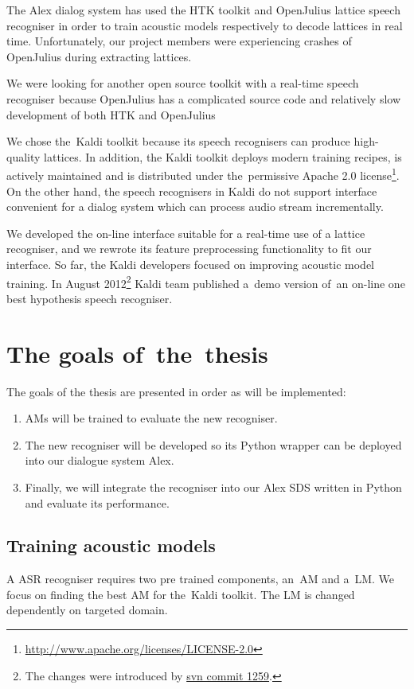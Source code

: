 The Alex dialog system has used the \ac{HTK} toolkit\cite{young94htk} and OpenJulius\cite{lee2009julius} lattice speech recogniser in order to train acoustic models respectively to decode lattices in real time. 
Unfortunately, our project members were experiencing crashes of OpenJulius during extracting lattices.

We were looking for another open source toolkit with a real-time speech recogniser because OpenJulius has a complicated source code and relatively slow development of both \ac{HTK} and OpenJulius

We chose the~Kaldi toolkit because its speech recognisers can produce high-quality lattices.\cite{povey2012generating}
In addition, the Kaldi toolkit deploys modern training recipes, is actively maintained and is distributed under the~permissive Apache 2.0 license\footnote{\url{http://www.apache.org/licenses/LICENSE-2.0}}.
On the other hand, the speech recognisers in Kaldi do not support interface convenient for a dialog system which can process audio stream incrementally.

We developed the on-line interface suitable for a real-time use of a lattice recogniser, and we rewrote its feature preprocessing functionality to fit our interface.
So far, the Kaldi developers focused on improving acoustic model training. 
In August 2012\footnote{The changes were introduced by \href{https://sourceforge.net/p/kaldi/code/1259/}{svn commit 1259}.} Kaldi team published a~demo version of~an on-line one best hypothesis speech recogniser.

\section{The goals of~the~thesis} 
\label{sec:goals}
The goals of the thesis are presented in order as will be implemented:
\begin{enumerate}
    \item \acp{AM} will be trained to evaluate the new recogniser.
    \item The new recogniser will be developed so its Python wrapper can be deployed into our dialogue system Alex.
    \item Finally, we will integrate the recogniser into our Alex \ac{SDS} written in Python and evaluate its performance.
\end{enumerate}

\subsection{Training acoustic models} 
\label{sub:training_kaldi_acoustic_models}
A \acl{ASR} recogniser requires two pre trained components, an~\acl{AM} and a~\acl{LM}. 
We focus on finding the best \acl{AM} for the~Kaldi toolkit. 
The \acl{LM} is changed dependently on targeted domain.

